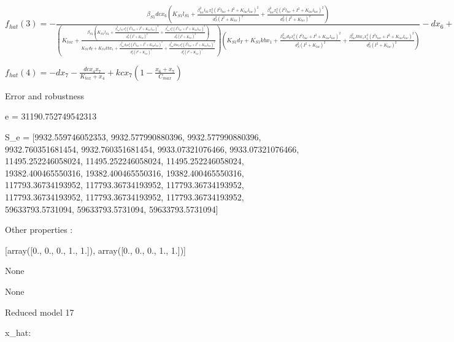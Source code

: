 $f_{hat}(3)=- \frac{\beta_{S1} dc x_{6} \left(K_{S1} l_{S1} + \frac{\beta_{lac}^{2} l_{S1} x_{6}^{2} \left(I^{2} l_{lac} + I^{2} + K_{lac} l_{lac}\right)^{2}}{d_{S}^{2} \left(I^{2} + K_{lac}\right)^{2}} + \frac{\beta_{lac}^{2} x_{6}^{2} \left(I^{2} l_{lac} + I^{2} + K_{lac} l_{lac}\right)^{2}}{d_{S}^{2} \left(I^{2} + K_{lac}\right)^{2}}\right)}{\left(K_{tox} + \frac{\beta_{S1} \left(K_{S1} l_{S1} + \frac{\beta_{lac}^{2} l_{S1} x_{6}^{2} \left(I^{2} l_{lac} + I^{2} + K_{lac} l_{lac}\right)^{2}}{d_{S}^{2} \left(I^{2} + K_{lac}\right)^{2}} + \frac{\beta_{lac}^{2} x_{6}^{2} \left(I^{2} l_{lac} + I^{2} + K_{lac} l_{lac}\right)^{2}}{d_{S}^{2} \left(I^{2} + K_{lac}\right)^{2}}\right)}{K_{S1} d_{T} + K_{S1} kb x_{1} + \frac{\beta_{lac}^{2} d_{T} x_{6}^{2} \left(I^{2} l_{lac} + I^{2} + K_{lac} l_{lac}\right)^{2}}{d_{S}^{2} \left(I^{2} + K_{lac}\right)^{2}} + \frac{\beta_{lac}^{2} kb x_{1} x_{6}^{2} \left(I^{2} l_{lac} + I^{2} + K_{lac} l_{lac}\right)^{2}}{d_{S}^{2} \left(I^{2} + K_{lac}\right)^{2}}}\right) \left(K_{S1} d_{T} + K_{S1} kb x_{1} + \frac{\beta_{lac}^{2} d_{T} x_{6}^{2} \left(I^{2} l_{lac} + I^{2} + K_{lac} l_{lac}\right)^{2}}{d_{S}^{2} \left(I^{2} + K_{lac}\right)^{2}} + \frac{\beta_{lac}^{2} kb x_{1} x_{6}^{2} \left(I^{2} l_{lac} + I^{2} + K_{lac} l_{lac}\right)^{2}}{d_{S}^{2} \left(I^{2} + K_{lac}\right)^{2}}\right)} - d x_{6} + kc x_{6} \left(1 - \frac{x_{6} + x_{7}}{C_{max}}\right)$


$f_{hat}(4)=- d x_{7} - \frac{dc x_{4} x_{7}}{K_{tox} + x_{4}} + kc x_{7} \left(1 - \frac{x_{6} + x_{7}}{C_{max}}\right)$



Error and robustness 


e = 31190.752749542313

S_e = [9932.559746052353, 9932.577990880396, 9932.577990880396, 9932.760351681454, 9932.760351681454, 9933.07321076466, 9933.07321076466, 11495.252246058024, 11495.252246058024, 11495.252246058024, 19382.400465550316, 19382.400465550316, 19382.400465550316, 117793.36734193952, 117793.36734193952, 117793.36734193952, 117793.36734193952, 117793.36734193952, 117793.36734193952, 59633793.5731094, 59633793.5731094, 59633793.5731094]

Other properties :


[array([0., 0., 0., 1., 1.]), array([0., 0., 0., 1., 1.])]

None

None

Reduced model 17

x_{hat}: 

